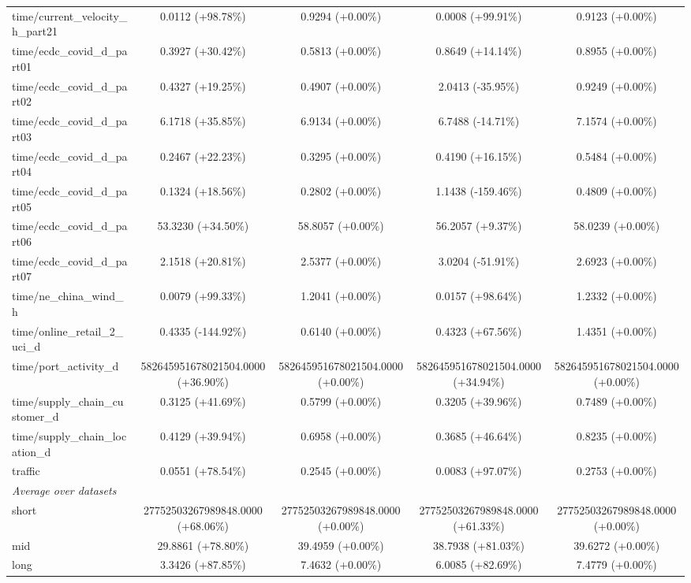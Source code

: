 \begin{table}[htbp]
{\begin{tabular}{lcccc}
time/current\_velocity\_h\_part21 & 0.0112 (+98.78\%) & 0.9294 (+0.00\%) & 0.0008 (+99.91\%) & 0.9123 (+0.00\%) \\
time/ecdc\_covid\_d\_part01 & 0.3927 (+30.42\%) & 0.5813 (+0.00\%) & 0.8649 (+14.14\%) & 0.8955 (+0.00\%) \\
time/ecdc\_covid\_d\_part02 & 0.4327 (+19.25\%) & 0.4907 (+0.00\%) & 2.0413 (-35.95\%) & 0.9249 (+0.00\%) \\
time/ecdc\_covid\_d\_part03 & 6.1718 (+35.85\%) & 6.9134 (+0.00\%) & 6.7488 (-14.71\%) & 7.1574 (+0.00\%) \\
time/ecdc\_covid\_d\_part04 & 0.2467 (+22.23\%) & 0.3295 (+0.00\%) & 0.4190 (+16.15\%) & 0.5484 (+0.00\%) \\
time/ecdc\_covid\_d\_part05 & 0.1324 (+18.56\%) & 0.2802 (+0.00\%) & 1.1438 (-159.46\%) & 0.4809 (+0.00\%) \\
time/ecdc\_covid\_d\_part06 & 53.3230 (+34.50\%) & 58.8057 (+0.00\%) & 56.2057 (+9.37\%) & 58.0239 (+0.00\%) \\
time/ecdc\_covid\_d\_part07 & 2.1518 (+20.81\%) & 2.5377 (+0.00\%) & 3.0204 (-51.91\%) & 2.6923 (+0.00\%) \\
time/ne\_china\_wind\_h & 0.0079 (+99.33\%) & 1.2041 (+0.00\%) & 0.0157 (+98.64\%) & 1.2332 (+0.00\%) \\
time/online\_retail\_2\_uci\_d & 0.4335 (-144.92\%) & 0.6140 (+0.00\%) & 0.4323 (+67.56\%) & 1.4351 (+0.00\%) \\
time/port\_activity\_d & 582645951678021504.0000 (+36.90\%) & 582645951678021504.0000 (+0.00\%) & 582645951678021504.0000 (+34.94\%) & 582645951678021504.0000 (+0.00\%) \\
time/supply\_chain\_customer\_d & 0.3125 (+41.69\%) & 0.5799 (+0.00\%) & 0.3205 (+39.96\%) & 0.7489 (+0.00\%) \\
time/supply\_chain\_location\_d & 0.4129 (+39.94\%) & 0.6958 (+0.00\%) & 0.3685 (+46.64\%) & 0.8235 (+0.00\%) \\
traffic & 0.0551 (+78.54\%) & 0.2545 (+0.00\%) & 0.0083 (+97.07\%) & 0.2753 (+0.00\%) \\
\midrule
\multicolumn{5}{l}{\textit{Average over datasets}} \\
short & 27752503267989848.0000 (+68.06\%) & 27752503267989848.0000 (+0.00\%) & 27752503267989848.0000 (+61.33\%) & 27752503267989848.0000 (+0.00\%) \\
mid & 29.8861 (+78.80\%) & 39.4959 (+0.00\%) & 38.7938 (+81.03\%) & 39.6272 (+0.00\%) \\
long & 3.3426 (+87.85\%) & 7.4632 (+0.00\%) & 6.0085 (+82.69\%) & 7.4779 (+0.00\%) \\
\bottomrule
\end{tabular}%
}
\label{tab:tsfm-nmse-marginals}
\end{table}